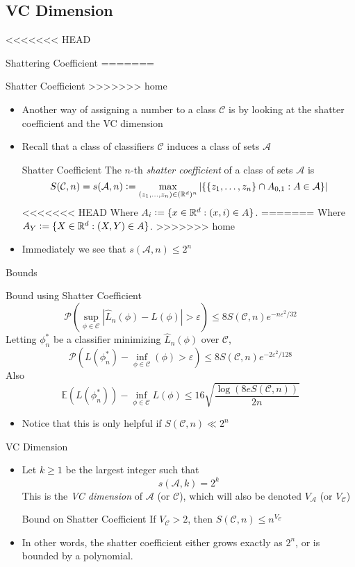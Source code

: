 \documentclass{beamer}
\renewcommand{\Pr}[1]{\mathcal{P} \left( #1 \right)}
\newcommand{\cls}{\mathcal{C}}
\newcommand{\E}[1]{\mathbb{E}\left( #1 \right)}
\newcommand{\R}{\mathbb{R}}
\newcommand{\defeq}{\vcentcolon=}
\newcommand{\abs}[1]{\left| #1 \right|}
\newcommand{\br}[1]{\left\{ #1 \right\} }
\newcommand{\eps}{\varepsilon}
\begin{document}
\subsection{VC Dimension}
<<<<<<< HEAD
\begin{frame}{Shattering Coefficient}
=======
\begin{frame}{Shatter Coefficient}
>>>>>>> home
\begin{itemize}
\item Another way of assigning a number to a class $\cls$ is by looking at the shatter coefficient and the VC dimension
\item Recall that a class of classifiers $\cls$ induces a class of sets $\mathcal A$
\begin{block}{Shatter Coefficient}
The $n$-th \emph{shatter coefficient} of a class of sets $\mathcal{A}$ is
\[ S(\cls, n) = s(\mathcal A, n) \defeq \max_{(z_1,\ldots,z_n)\in (\R^d)^n} \abs{ \br{ \br{z_1, \ldots, z_n} \cap A_{0,1} : A \in \mathcal A}} \]
<<<<<<< HEAD
Where $A_i \defeq \{x \in \R^d : (x,i) \in A\}$.
=======
Where $A_Y \defeq \{X \in \R^d : (X,Y) \in A\}$.
>>>>>>> home
\end{block}
\item Immediately we see that $s(\mathcal A, n) \leq 2^n$
\end{itemize}
\end{frame}


\begin{frame}{Bounds}
\begin{block}{Bound using Shatter Coefficient}
\[ \Pr{ \sup_{\phi \in \cls} \abs{ \hat{L}_n (\phi) - L(\phi)} > \eps } \leq 8 S(\cls, n) e^{-n\eps^2/32} \]
Letting $\phi_n^*$ be a classifier minimizing $\hat{L}_n(\phi)$ over $\cls$,
\[ \Pr{ L(\phi^*_n) - \inf_{\phi \in \cls} (\phi) > \eps } \leq 8 S(\cls,n)e^{-2\eps^2/128} \]
Also
\[ \E{L(\phi^*_n)} - \inf_{\phi\in\cls} L(\phi) \leq 16 \sqrt{\frac{\log(8eS(\cls, n))}{2n}} \]
\end{block}
\begin{itemize}
\item Notice that this is only helpful if $S(\cls,n) \ll 2^n$
\end{itemize}
\end{frame}

\begin{frame}{VC Dimension}
\begin{itemize}
\item Let $k \geq 1$ be the largest integer such that
\[ s(\mathcal A, k) = 2^k \]
This is the \emph{VC dimension} of $\mathcal A$ (or $\cls$), which will also be denoted $V_{\mathcal A}$ (or $V_\cls$)
\begin{block}{Bound on Shatter Coefficient}
If $V_\cls > 2$, then $S(\cls, n) \leq n^{V_\cls}$
\end{block}
\item In other words, the shatter coefficient either grows exactly as $2^n$, or is bounded by a polynomial.
\end{itemize}
\end{frame}


\end{frame}
\end{document}

